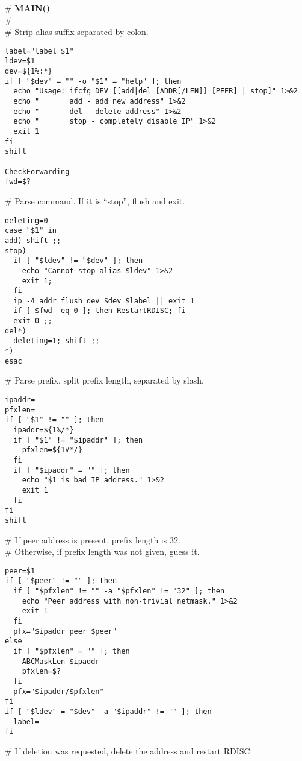 \begin{flushleft}
\# {\bf MAIN()}\\
\#\\
\# Strip alias suffix separated by colon.
\end{flushleft}
\begin{verbatim}
label="label $1"
ldev=$1
dev=${1%:*}
if [ "$dev" = "" -o "$1" = "help" ]; then
  echo "Usage: ifcfg DEV [[add|del [ADDR[/LEN]] [PEER] | stop]" 1>&2
  echo "       add - add new address" 1>&2
  echo "       del - delete address" 1>&2
  echo "       stop - completely disable IP" 1>&2
  exit 1
fi
shift

CheckForwarding
fwd=$?
\end{verbatim}
\begin{flushleft}
\# Parse command. If it is ``stop'', flush and exit.
\end{flushleft}
\begin{verbatim}
deleting=0
case "$1" in
add) shift ;;
stop)
  if [ "$ldev" != "$dev" ]; then
    echo "Cannot stop alias $ldev" 1>&2
    exit 1;
  fi
  ip -4 addr flush dev $dev $label || exit 1
  if [ $fwd -eq 0 ]; then RestartRDISC; fi
  exit 0 ;;
del*)
  deleting=1; shift ;;
*)
esac
\end{verbatim}
\begin{flushleft}
\# Parse prefix, split prefix length, separated by slash.
\end{flushleft}
\begin{verbatim}
ipaddr=
pfxlen=
if [ "$1" != "" ]; then
  ipaddr=${1%/*}
  if [ "$1" != "$ipaddr" ]; then
    pfxlen=${1#*/}
  fi
  if [ "$ipaddr" = "" ]; then
    echo "$1 is bad IP address." 1>&2
    exit 1
  fi
fi
shift
\end{verbatim}
\begin{flushleft}
\# If peer address is present, prefix length is 32.\\
\# Otherwise, if prefix length was not given, guess it.
\end{flushleft}
\begin{verbatim}
peer=$1
if [ "$peer" != "" ]; then
  if [ "$pfxlen" != "" -a "$pfxlen" != "32" ]; then
    echo "Peer address with non-trivial netmask." 1>&2
    exit 1
  fi
  pfx="$ipaddr peer $peer"
else
  if [ "$pfxlen" = "" ]; then
    ABCMaskLen $ipaddr
    pfxlen=$?
  fi
  pfx="$ipaddr/$pfxlen"
fi
if [ "$ldev" = "$dev" -a "$ipaddr" != "" ]; then
  label=
fi
\end{verbatim}
\begin{flushleft}
\# If deletion was requested, delete the address and restart RDISC
\end{flushleft}
